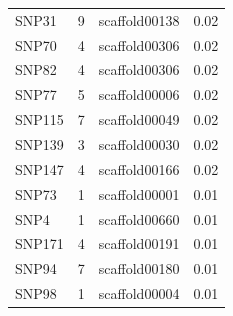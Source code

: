 \begin{longtable}{lrlr}
  SNP31 &   9 & scaffold00138 & 0.02 \\ 
  SNP70 &   4 & scaffold00306 & 0.02 \\ 
  SNP82 &   4 & scaffold00306 & 0.02 \\ 
  SNP77 &   5 & scaffold00006 & 0.02 \\ 
  SNP115 &   7 & scaffold00049 & 0.02 \\ 
  SNP139 &   3 & scaffold00030 & 0.02 \\ 
  SNP147 &   4 & scaffold00166 & 0.02 \\ 
  SNP73 &   1 & scaffold00001 & 0.01 \\ 
  SNP4 &   1 & scaffold00660 & 0.01 \\ 
  SNP171 &   4 & scaffold00191 & 0.01 \\ 
  SNP94 &   7 & scaffold00180 & 0.01 \\ 
  SNP98 &   1 & scaffold00004 & 0.01 \\ 
\hline
\end{longtable}


%
%



